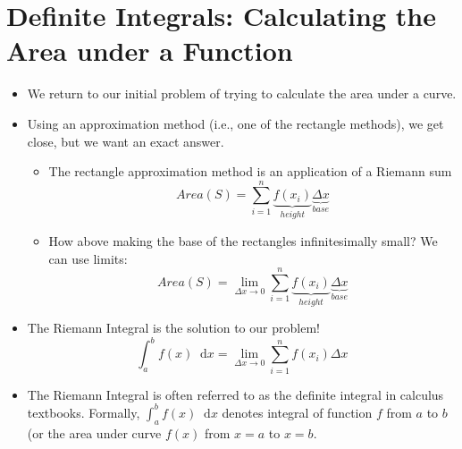 \documentclass[11pt]{article}
\theoremstyle{definition}
\theoremstyle{remark}
\newcommand*\diff{\mathop{}\!\mathrm{d}}
\begin{document}
\section{Definite Integrals: Calculating the Area under a Function}
\begin{itemize}
\item We return to our initial problem of trying to calculate the area under a curve. \item Using an approximation method (i.e., one of the rectangle methods), we get close, but we want an exact answer.
\begin{itemize}
\item The rectangle approximation method is an application of a Riemann sum
$$
Area(S) = \sum_{i=1}^n \underbrace{f(x_i)}_{height} \underbrace{\Delta x}_{base}
$$
\item How above making the base of the rectangles infinitesimally small? We can use limits:
$$
Area(S) = \lim_{\Delta x\rightarrow 0} \sum_{i=1}^n \underbrace{f(x_i)}_{height} \underbrace{\Delta x}_{base}
$$
\end{itemize}
\item The Riemann Integral is the solution to our problem!
$$
\int_a^b f(x) \diff x = \lim_{\Delta x\rightarrow 0} \sum_{i=1}^n f(x_i) \Delta x
$$
\item The Riemann Integral is often referred to as the definite integral in calculus textbooks. Formally,  $\displaystyle \int_a^b f(x) \diff x$  denotes integral of function $f$ from $a$ to $b$ (or the area under curve $f(x)$ from $x=a$ to $x=b$.
\end{itemize}
\end{document}
